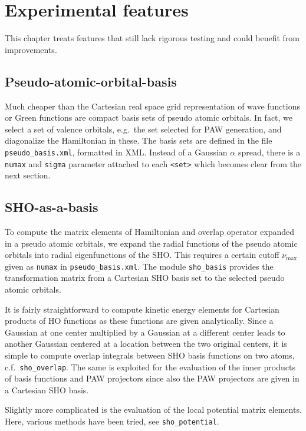 \documentclass[oribibl]{llncs}
\newcommand{\um}[1]{_{\mathrm{#1}}}
\newcommand{\ttt}[1]{\texttt{#1}}
\begin{document}
\newpage
%

\section{Experimental features}
This chapter treats features that still lack rigorous testing and could benefit from improvements.

\subsection{Pseudo-atomic-orbital-basis}
Much cheaper than the Cartesian real space grid representation of wave functions or Green functions
are compact basis sets of pseudo atomic orbitals.
In fact, we select a set of valence orbitals, e.g.~the set selected for \ac{PAW} generation,
and diagonalize the Hamiltonian in these.
The basis sets are defined in the file \ttt{pseudo\_basis.xml}, formatted in \ac{XML}.
Instead of a Gaussian $\alpha$ spread, there is a \ttt{numax} and \ttt{sigma} parameter attached to each \ttt{<set>} which becomes clear from the next section.

\subsection{SHO-as-a-basis} \label{sec:sho-hamiltonian}
To compute the matrix elements of Hamiltonian and overlap operator expanded in a pseudo atomic orbitals,
we expand the radial functions of the pseudo atomic orbitals into radial eigenfunctions of the \ac{SHO}.
This requires a certain cutoff $\nu\um{max}$ given as \ttt{numax} in \ttt{pseudo\_basis.xml}.
The module \ttt{sho\_basis} provides the transformation matrix from a Cartesian \ac{SHO} basis set
to the selected pseudo atomic orbitals. 

It is fairly straightforward to compute kinetic energy elements for Cartesian products of \ac{HO} functions
as these functions are given analytically.
Since a Gaussian at one center multiplied by a Gaussian at a different center leads to another Gaussian
centered at a location between the two original centers, it is simple to compute overlap integrals between \ac{SHO} basis
functions on two atoms, c.f.~\ttt{sho\_overlap}.
The same is exploited for the evaluation of the inner products of basis functions and \ac{PAW} projectors
since also the \ac{PAW} projectors are given in a Cartesian \ac{SHO} basis.

Slightly more complicated is the evaluation of the local potential matrix elements.
Here, various methods have been tried, see \ttt{sho\_potential}.
\end{document}
